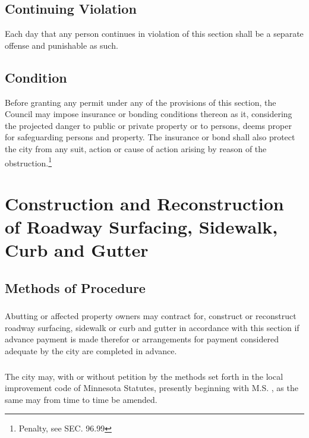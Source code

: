 \subsection{Continuing Violation}
Each day that any person continues in violation of this section shall be a separate offense and punishable as such.
\subsection{Condition}
Before granting any permit under any of the provisions of this section, the Council may impose insurance or bonding conditions thereon as it, considering the projected danger to public or private property or to persons, deems proper for safeguarding persons and property.  The insurance or bond shall also protect the city from any suit, action or cause of action arising by reason of the obstruction.\footnote{Penalty, see SEC. 96.99}

\section{Construction and Reconstruction of Roadway Surfacing, Sidewalk, Curb and Gutter}
\subsection{Methods of Procedure}
\subsubsection{}
Abutting or affected property owners may contract for, construct or reconstruct roadway surfacing, sidewalk or curb and gutter in accordance with this section if advance payment is made therefor or arrangements for payment considered adequate by the city are completed in advance.
\subsubsection{}
The city may, with or without petition by the methods set forth in the local improvement code of Minnesota Statutes, presently beginning with M.S. , as the same may from time to time be amended.
